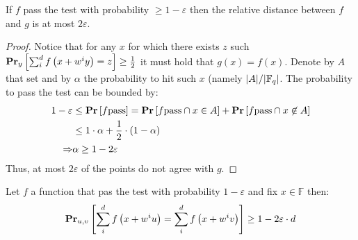 \begin{claim}
  If $f$ pass the test with probability $\ge 1 - \varepsilon$ then the relative distance between $f$ and $g$ is at most $2\varepsilon$.
\end{claim}

\begin{proof}
  Notice that for any $x$ for  which there exists $z$ such $\prbm{ \sum_{i}^{d}{f\left( x + w^{i}y \right) = z }}{y} \ge \frac{1}{2}$ it must hold that $g(x) = f(x)$. Denote by $A$ that set and by $\alpha$ the probability to hit such $x$ (namely $|A| / |\FF|$. The probability to pass the test can be bounded by:  
  \begin{equation*}
    \begin{split}
      1- \varepsilon & \le \prb{ f \text{pass}} = \prb{ f \text{pass} \cap x \in A } + \prb{ f \text{pass} \cap x \not\in A} \\
      & \le 1 \cdot \alpha + \frac{1}{2} \cdot \left( 1 -\alpha \right) \\
      \Rightarrow & \alpha \ge 1 - 2\varepsilon 
    \end{split}
  \end{equation*}
  Thus, at most $2\varepsilon$ of the points do not agree with $g$. 
\end{proof}

\begin{claim}
  Let $f$ a function that pas the test with probability $1-\varepsilon$ and fix $x \in \mathbb{F}$ then: 
\begin{equation*}
  \begin{split}
    \prbm{  \sum_{i}^{d}{f\left( x + w^{i}u \right)} = \sum_{i}^{d}{f\left( x + w^{i}v \right)} }{ u,v} \ge 1 - 2\varepsilon \cdot d
  \end{split}
\end{equation*}
\end{claim}

